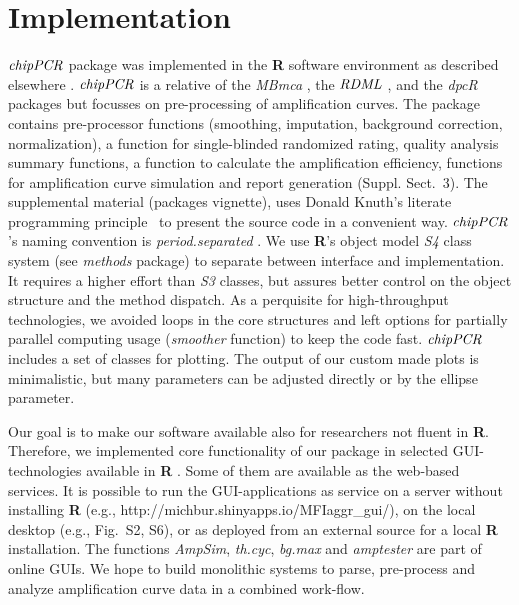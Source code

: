 \documentclass{bioinfo}
\begin{document}
\section{Implementation}
\begin{methods}

$\emph{chipPCR}$ package was implemented in the \textbf{R} software environment 
as described elsewhere \citep{RCT_2013,rodiger_rkward_2012}. $\emph{chipPCR}$ is 
a relative of the \emph{MBmca} \citep{roediger_RJ_2013}, the $\emph{RDML}$  
\citep{blagodatskikh_2014}, and the \emph{dpcR} \citep{pabinger_2014} packages 
but focusses on pre-processing of amplification curves. The package contains 
pre-processor functions (smoothing, imputation, background correction, 
normalization), a function for single-blinded randomized rating, quality 
analysis summary functions, a function to calculate the amplification 
efficiency, functions for amplification curve simulation and report 
generation (Suppl. Sect.~3). The supplemental material %
(packages vignette), uses Donald Knuth's literate programming 
principle~\citep{Knuth1984} to present the source code in a convenient way. 
$\emph{chipPCR}$'s naming convention is \textit{period.separated} 
\citep{Baaaath_2012}. We use \textbf{R}'s object model \emph{S4} class system 
(see \emph{methods} package) to separate between interface and implementation. 
It requires a higher effort than \emph{S3} classes, but assures better control 
on the object structure and the method dispatch. As a perquisite for 
high-throughput technologies, we avoided loops in the core structures and left 
options for partially parallel computing usage (\textsl{smoother} function) to 
keep the code fast. $\emph{chipPCR}$ includes a set of classes for plotting. The 
output of our custom made plots is minimalistic, but many parameters can be 
adjusted directly or by the ellipse parameter.

Our goal is to make our software available also for researchers not fluent in 
\textbf{R}. Therefore, we implemented core functionality of our package in selected 
GUI-technologies available in \textbf{R} \citep{rodiger_rkward_2012, 
shiny_2014}. Some of them are available as the web-based services. It is 
possible to run the GUI-applications as service on a server without installing 
\textbf{R} (e.g., http://michbur.shinyapps.io/MFIaggr\_gui/), on the local 
desktop (e.g., Fig.~S2, S6), or as deployed from an external %
source for a local \textbf{R} installation. The functions \textsl{AmpSim}, 
\textsl{th.cyc}, \textsl{bg.max} and \textsl{amptester} are part of online GUIs. 
We hope to build monolithic systems to parse, pre-process and analyze 
amplification curve data in a combined work-flow. 


\end{methods}
\end{document}
